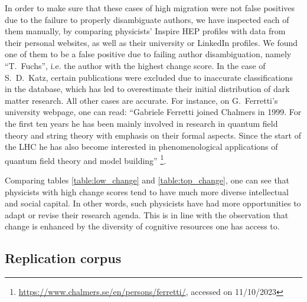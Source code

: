 \documentclass{article}
\begin{document}
In order to make sure that these cases of high migration were not false positives due to the failure to properly disambiguate authors, we have inspected each of them manually, by comparing physicists' Inspire HEP profiles with data from their personal websites, as well as their university or LinkedIn profiles. We found one of them to be a false positive due to failing author disambiguation, namely ``T.~Fuchs'', i.e. the author with the highest change score. In the case of S.~D.~Katz, certain publications were excluded due to inaccurate classifications in the database, which has led to overestimate their initial distribution of dark matter research. All other cases are accurate.
For instance, on G.~Ferretti's university webpage, one can read: ``Gabriele Ferretti joined Chalmers in 1999. For the first ten years he has been mainly involved in research in quantum field theory and string theory with emphasis on their formal aspects. Since the start of the LHC he has also become interested in phenomenological applications of quantum field theory and model building'' \footnote{\url{https://www.chalmers.se/en/persons/ferretti/}, accessed on 11/10/2023}.

Comparing tables \ref{table:low_change} and \ref{table:top_change}, one can see that physicists with high change scores tend to have much more diverse intellectual and social capital. In other words, such physicists have had more opportunities to adapt or revise their research agenda. This is in line with the observation that change is enhanced by the diversity of cognitive resources one has access to.

\fontsize{6}{7}\selectfont\normalsize
\fontsize{6}{7}\selectfont\normalsize

\subsection{\label{appendix:hep_vs_acl}Replication corpus}
\end{document}
